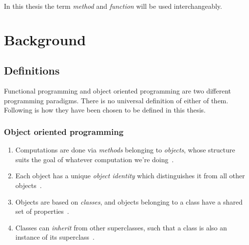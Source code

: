 \documentclass[a4paper,12pt]{article}
\begin{document}

In this thesis the term \textit{method} and \textit{function} will be used interchangeably.


\section{Background} \label{sec:Background} %

\subsection{Definitions} \label{sub:Definitions}
Functional programming and object oriented programming are two different programming paradigms. There is no universal definition of either of them. Following is how they have been chosen to be defined in this thesis.

\subsubsection{Object oriented programming} \label{ssub:object-oriented-programming} %

\begin{enumerate}
\item Computations are done via \textit{methods} belonging to \textit{objects}, whose structure suits the goal of whatever computation we're doing~\cite{john-m-chambers}.
\item Each object has a unique \textit{object identity} which distinguishes it from all other objects~\cite{khoshafian1986object}.
\item Objects are based on \emph{classes}, and objects belonging to a class have a shared set of properties~\cite{john-m-chambers}.
\item Classes can \emph{inherit} from other superclasses, such that a class is also an instance of its superclass~\cite{john-m-chambers}.
\end{enumerate}
\end{document}
